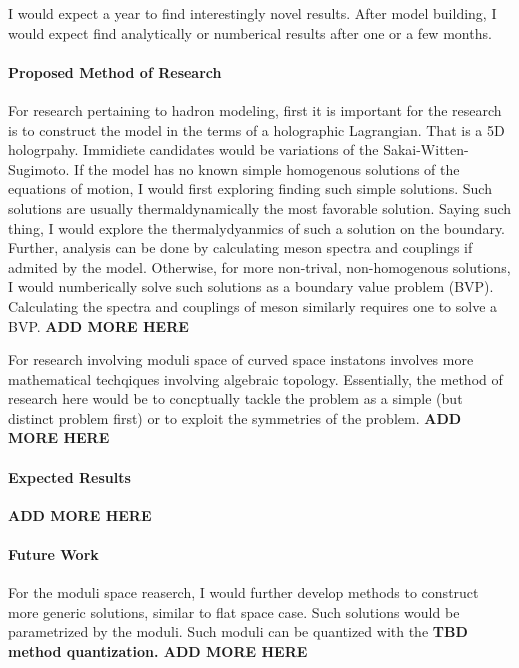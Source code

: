 \documentclass[12pt]{article}
\begin{document}
I would expect a year to find interestingly novel results.
%
After model building, I would expect find analytically or numberical results after one or a few months.

\paragraph{Proposed Method of Research}

For research pertaining to hadron modeling, first it is important for the research is to construct the model in the terms of a holographic Lagrangian.
%
That is a 5D hologrpahy.
%
Immidiete candidates would be variations of the Sakai-Witten-Sugimoto.
%
If the model has no known simple homogenous solutions of the equations of motion, I would first exploring finding such simple solutions.
%
Such solutions are usually thermaldynamically the most favorable solution.
%
Saying such thing, I would explore the thermalydyanmics of such a solution on the boundary.
%
Further, analysis can be done by calculating meson spectra and couplings if admited by the model.
%
Otherwise, for more non-trival, non-homogenous solutions, I would numberically solve such solutions as a boundary value problem (BVP).
%
Calculating the spectra and couplings of meson similarly requires one to solve a BVP.
%
\large{\bf{ADD MORE HERE}}

For research involving moduli space of curved space instatons involves more mathematical techqiques involving algebraic topology.
%
Essentially, the method of research here would be to concptually tackle the problem as a simple (but distinct problem first) or to exploit the symmetries of the problem.
%
\large{\bf{ADD MORE HERE}}

\paragraph{Expected Results}

\large{\bf{ADD MORE HERE}}

\paragraph{Future Work}

For the moduli space reaserch, I would further develop methods to construct more generic solutions, similar to flat space case.
%
Such solutions would be parametrized by the moduli.
%
Such moduli can be quantized with the \bf{TBD} method quantization.
%
\large{\bf{ADD MORE HERE}}
\end{document}
